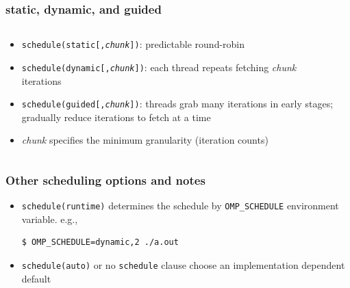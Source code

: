 \documentclass[12pt,dvipdfmx]{beamer}
\newcommand{\ao}[1]{{\color{blue}#1}}
\begin{document}
\begin{frame}
\frametitle{static, dynamic, and guided}
\begin{columns}[t]
  \begin{column}{0.53\textwidth}
\begin{itemize}
\item {\tt schedule(\ao{static{\rm [,{\em chunk}]}})}: 
  predictable round-robin
\item {\tt schedule(\ao{dynamic{\rm [,{\em chunk}]}})}:
  each thread repeats fetching {\em chunk} iterations
\item {\tt schedule(\ao{guided{\rm [,{\em chunk}]}})}:
  threads grab many iterations in early stages;
  gradually reduce iterations to fetch at a time

\item \ao{\em chunk} specifies the minimum granularity
  (iteration counts)
\end{itemize}
  \end{column}

  \begin{column}{0.47\textwidth}
\def\svgwidth{\textwidth}
{\scriptsize }
  \end{column}
\end{columns}
\end{frame}

\begin{frame}[fragile]
\frametitle{Other scheduling options and notes}
\begin{itemize}
\item {\tt schedule(\ao{runtime})} determines the schedule by
  {\tt OMP\_SCHEDULE} environment variable. e.g.,
\begin{lstlisting}
$ OMP_SCHEDULE=dynamic,2 ./a.out
\end{lstlisting} %

\item {\tt schedule(\ao{auto})} or \ao{no {\tt schedule} clause} choose
  an implementation dependent default


\end{itemize}
\end{frame}
\end{document}
